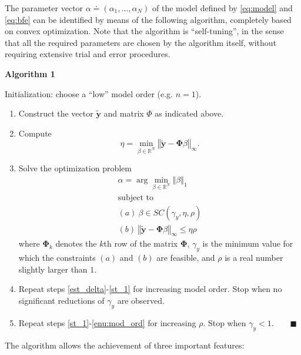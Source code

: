 \documentclass[twocolumn,english,journal]{IEEEtran}
\begin{document}
The parameter vector $\alpha\doteq(\alpha_{1},\ldots,\alpha_{N})$
of the model defined by \eqref{eq:model} and \eqref{eq:bfe} can
be identified by means of the following algorithm, completely based
on convex optimization. Note that the algorithm is ``self-tuning'',
in the sense that all the required parameters are chosen by the algorithm
itself, without requiring extensive trial and error procedures.\medskip{}


\textbf{Algorithm 1}\medskip{}


Initialization: choose a ``low'' model order (e.g. $n=1$).\medskip{}

\begin{enumerate}
\item \label{est_delta}Construct the vector $\tilde{\boldsymbol{y}}$ and
matrix $\Phi$ as indicated above.\medskip{}

\item \label{enu:eta}Compute
\[
\eta=\min\limits _{\beta\in\mathbb{R}^{N}}\left\Vert \widetilde{\mathbf{y}}-\mathbf{\Phi}\beta\right\Vert _{\infty}.
\]

\item \label{st_1}Solve the optimization problem
\begin{equation}
\begin{array}{l}
\alpha=\arg\min\limits _{\beta\in\mathbb{R}^{N}}\left\Vert \beta\right\Vert _{1}\\
\text{subject to}\\
(a)\ \beta\in SC(\gamma_{y},\eta,\rho)\\
(b)\ \left\Vert \widetilde{\mathbf{y}}-\mathbf{\Phi}\beta\right\Vert _{\infty}\leq\eta\rho
\end{array}\label{opt21a}
\end{equation}
where $\mathbf{\Phi}_{k}$ denotes the $k$th row of the matrix $\mathbf{\Phi}$,
$\gamma_{y}$ is the minimum value for which the constraints $(a)$
and $(b)$ are feasible, and $\rho$ is a real number slightly larger
than $1$.\medskip{}

\item \label{enu:mod_ord}Repeat steps \ref{est_delta}-\ref{st_1} for
increasing model order. Stop when no significant reductions of $\gamma_{y}$
are observed.\medskip{}

\item \label{enu:rho}Repeat steps \ref{st_1}-\ref{enu:mod_ord} for increasing
$\rho$. Stop when $\gamma_{y}<1$.$\qquad\blacksquare$\medskip{}

\end{enumerate}
The algorithm allows the achievement of three important features:\medskip{}
\end{document}
